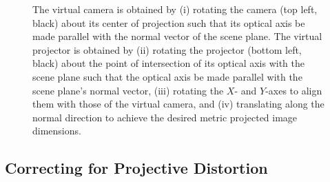 \documentclass[review]{elsarticle}
\begin{document}
\begin{figure}
    \centering
    \qquad
    \caption{The virtual camera is obtained by (i) rotating the camera (top left, black) about its center of projection such that its optical axis be made parallel with the normal vector of the scene plane. The virtual projector is obtained by (ii) rotating the projector (bottom left, black) about the point of intersection of its optical axis with the scene plane such that the optical axis be made parallel with the scene plane's normal vector, (iii) rotating the $X$- and $Y$-axes to align them with those of the virtual camera, and (iv) translating along the normal direction to achieve the desired metric projected image dimensions.} %
    \label{fig:virtualproj}
\end{figure}

\subsection{Correcting for Projective Distortion}\label{sec:approach:homography}
\end{document}
